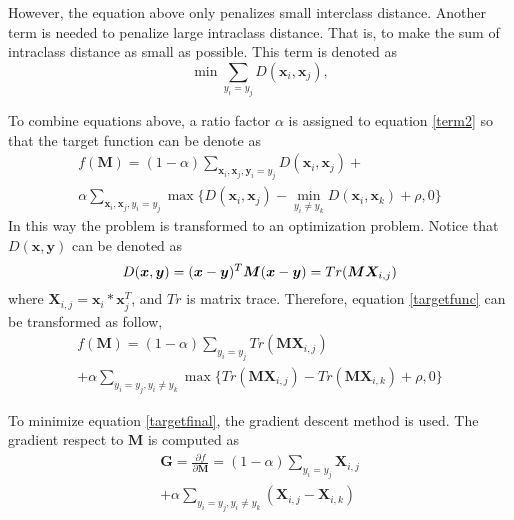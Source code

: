 \documentclass[conference,compsoc]{IEEEtran}
\begin{document}
 However, the equation above only penalizes small interclass distance. Another term is needed to penalize large intraclass distance. That is, to make the sum of intraclass distance as small as possible. This term is denoted as 
 \begin{equation}
 \min \sum_{y_i = y_j} D(\bm{x}_i,\bm{x}_j),
 \end{equation}
 
 To combine equations above, a ratio factor $\alpha$ is assigned to equation \ref{term2} so that the target function can be denote as 
  \begin{equation}\label{targetfunc}
  \begin{aligned}
 f(\bm{M}) = (1-\alpha)\sum_{\bm{x}_i,\bm{x}_j,\bm{y}_i=y_j} D(\bm{x}_i,\bm{x}_j) + \\ 
 \alpha \sum_{\bm{x}_i,\bm{x}_j,y_i=y_j}\max\{{D(\bm{x}_i,\bm{x}_j)-\min_{y_i\ne y_k}{D(\bm{x}_i,\bm{x}_k)}+\rho,0}\}
 \end{aligned}
 \end{equation}
 In this way the problem is transformed to an optimization problem. Notice that $D(\bm{x},\bm{y})$ can be denoted as 
 \begin{equation}
 D(\bm{x},\bm{y}) = (\bm{x} - \bm{y})^T\bm{M}(\bm{x} - \bm{y})\\ = Tr(\bm{M}\bm{X}_{i,j})
 \end{equation}
 where $\bm{X}_{i,j} = \bm{x}_i*\bm{x}_j^T$, and $Tr$ is matrix trace. Therefore, equation \ref{targetfunc} can be transformed as follow,
 \begin{equation}\label{targetfinal}
 \begin{aligned}
 f(\bm{M}) = (1-\alpha)\sum_{y_i = y_j}Tr(\bm{M}\bm{X}_{i,j}) \\
  + \alpha \sum_{y_i = y_j,y_i\ne y_k}\max\{Tr(\bm{M}\bm{X}_{i,j}) - Tr(\bm{M}\bm{X}_{i,k} )+ \rho,0\}
 \end{aligned}
 \end{equation}
 
 To minimize equation \ref{targetfinal}, the gradient descent method is used. The gradient respect to $\bm{M}$ is computed as
 \begin{equation}
 \begin{aligned}
 \bm{G} =\frac{\partial f}{\partial \bm{M}} = (1-\alpha) \sum_{y_i = y_j} \bm{X}_{i,j} \\
 + \alpha \sum_{y_i = y_j, y_i \ne y_k}(\bm{X}_{i,j} - \bm{X}_{i,k})
 \end{aligned}
 \end{equation}
 
\end{document}
